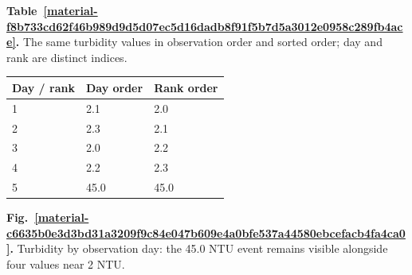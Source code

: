 \documentclass[11pt,a4paper]{article}
\newcounter{scripttable}
\begin{document}
\par\medskip
{}
\label{material-f8b733cd62f46b989d9d5d07ec5d16dadb8f91f5b7d5a3012e0958c289fb4ace}
\noindent\textbf{Table~\ref*{material-f8b733cd62f46b989d9d5d07ec5d16dadb8f91f5b7d5a3012e0958c289fb4ace}.} The same turbidity values in observation order and sorted order; day and rank are distinct indices.\par\nopagebreak
\begin{longtable}{@{}p{}p{}p{}@{}}
Day / rank & Day order & Rank order \\ \hline
\endhead
1 & 2.1 & 2.0 \\ \hline
2 & 2.3 & 2.1 \\ \hline
3 & 2.0 & 2.2 \\ \hline
4 & 2.2 & 2.3 \\ \hline
5 & 45.0 & 45.0 \\ \hline
\end{longtable}
\medskip

\par\medskip
\Needspace{10cm}
\label{material-c6635b0e3d3bd31a3209f9c84e047b609e4a0bfe537a44580ebcefacb4fa4ca0}
\noindent\textbf{Fig.~\ref*{material-c6635b0e3d3bd31a3209f9c84e047b609e4a0bfe537a44580ebcefacb4fa4ca0}.} Turbidity by observation day: the 45.0 NTU event remains visible alongside four values near 2 NTU.\par\nopagebreak
\begin{center}
\end{center}
\end{document}
